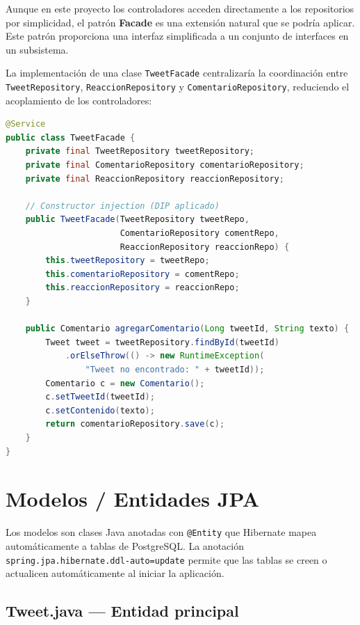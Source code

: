 \documentclass[12pt,a4paper]{article}
\begin{document}
Aunque en este proyecto los controladores acceden directamente a los repositorios por simplicidad, el patrón \textbf{Facade} es una extensión natural que se podría aplicar. Este patrón proporciona una interfaz simplificada a un conjunto de interfaces en un subsistema.

La implementación de una clase \texttt{TweetFacade} centralizaría la coordinación entre \texttt{TweetRepository}, \texttt{ReaccionRepository} y \texttt{ComentarioRepository}, reduciendo el acoplamiento de los controladores:

\begin{lstlisting}[style=javastyle, language=Java, caption=Estructura de TweetFacade como extensión futura]
@Service
public class TweetFacade {
    private final TweetRepository tweetRepository;
    private final ComentarioRepository comentarioRepository;
    private final ReaccionRepository reaccionRepository;

    // Constructor injection (DIP aplicado)
    public TweetFacade(TweetRepository tweetRepo,
                       ComentarioRepository comentRepo,
                       ReaccionRepository reaccionRepo) {
        this.tweetRepository = tweetRepo;
        this.comentarioRepository = comentRepo;
        this.reaccionRepository = reaccionRepo;
    }

    public Comentario agregarComentario(Long tweetId, String texto) {
        Tweet tweet = tweetRepository.findById(tweetId)
            .orElseThrow(() -> new RuntimeException(
                "Tweet no encontrado: " + tweetId));
        Comentario c = new Comentario();
        c.setTweetId(tweetId);
        c.setContenido(texto);
        return comentarioRepository.save(c);
    }
}
\end{lstlisting}


\section{Modelos / Entidades JPA}

Los modelos son clases Java anotadas con \texttt{@Entity} que Hibernate mapea automáticamente a tablas de PostgreSQL. La anotación \texttt{spring.jpa.hibernate.ddl-auto=update} permite que las tablas se creen o actualicen automáticamente al iniciar la aplicación.

\subsection{Tweet.java --- Entidad principal}
\end{document}

